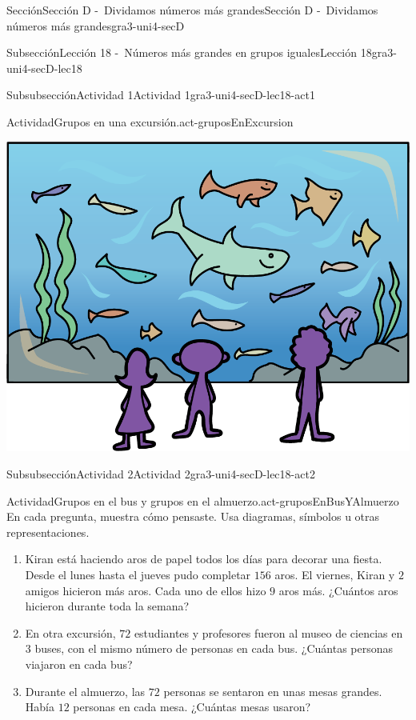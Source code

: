 \documentclass[twoside,10pt,]{article}
\begin{document}
\begin{sectionptx}{Sección}{Sección D -~Dividamos números más grandes}{}{Sección D -~Dividamos números más grandes}{}{}{gra3-uni4-secD}
\begin{subsectionptx}{Subsección}{Lección 18 -~Números más grandes en grupos iguales}{}{Lección 18}{}{}{gra3-uni4-secD-lec18}
\begin{subsubsectionptx}{Subsubsección}{Actividad 1}{}{Actividad 1}{}{}{gra3-uni4-secD-lec18-act1}
\begin{activity}{Actividad}{Grupos en una excursión.}{act-gruposEnExcursion}
\begin{image}{0.15}{0.7}{0.15}{}
\includegraphics[width=\linewidth]{external/png-source/CS 3.4 Lesson 18 Activity 1.png}
\end{image}%
\end{activity}%
\end{subsubsectionptx}
%
%
\typeout{************************************************}
\typeout{************************************************}
%
\begin{subsubsectionptx}{Subsubsección}{Actividad 2}{}{Actividad 2}{}{}{gra3-uni4-secD-lec18-act2}
\begin{activity}{Actividad}{Grupos en el bus y grupos en el almuerzo.}{act-gruposEnBusYAlmuerzo}%
En cada pregunta, muestra cómo pensaste. Usa diagramas, símbolos u otras representaciones.%
%
\begin{enumerate}
\item{}Kiran está haciendo aros de papel todos los días para decorar una fiesta. Desde el lunes hasta el jueves pudo completar \(156\) aros. El viernes, Kiran y \(2\) amigos hicieron más aros. Cada uno de ellos hizo \(9\) aros más. ¿Cuántos aros hicieron durante toda la semana?%
\item{}En otra excursión, \(72\) estudiantes y profesores fueron al museo de ciencias en \(3\) buses, con el mismo número de personas en cada bus. ¿Cuántas personas viajaron en cada bus?%
\item{}Durante el almuerzo, las \(72\) personas se sentaron en unas mesas grandes. Había \(12\) personas en cada mesa. ¿Cuántas mesas usaron?%
\end{enumerate}
\end{activity}%

\end{subsubsectionptx}
\end{subsectionptx}
\end{sectionptx}
\end{document}
